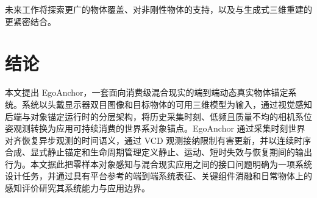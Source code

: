 \documentclass[review]{vgtc}
\begin{document}
未来工作将探索更广的物体覆盖、对非刚性物体的支持，以及与生成式三维重建的更紧密结合。

\section{结论}\label{sec:conclusion}

本文提出 EgoAnchor，一套面向消费级混合现实的端到端动态真实物体锚定系统。系统以头戴显示器双目图像和目标物体的可用三维模型为输入，通过视觉感知后端与对象锚定运行时的分层架构，将历史采集时刻、低频且质量不均的相机系位姿观测转换为应用可持续消费的世界系对象锚点。EgoAnchor 通过采集时刻世界对齐恢复异步观测的时间语义，通过 VCD 观测接纳限制有害更新，并以连续时序合成、显式静止锚定和生命周期管理定义静止、运动、短时失效与恢复期间的输出行为。本文据此把零样本对象感知与混合现实应用之间的接口问题明确为一项系统设计任务，并通过具有平台参考的端到端系统表征、关键组件消融和日常物体上的感知评价研究其系统能力与应用边界。

\clearpage
\raggedbottom



\end{document}
